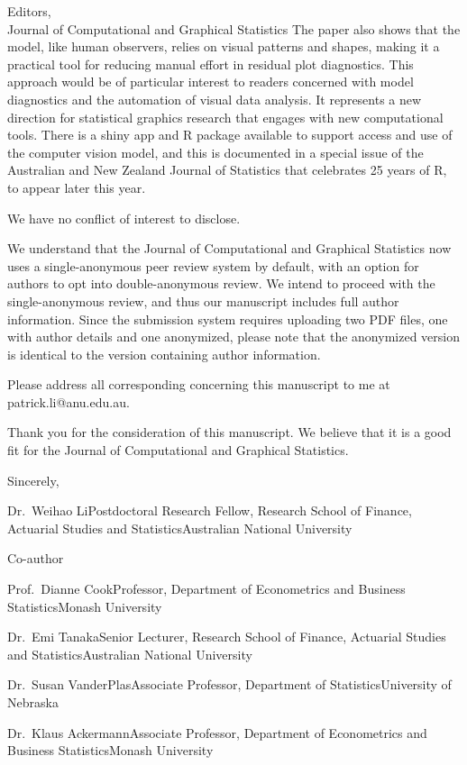 \documentclass[
  12pt,
  letterpaper]{letter}
\begin{document}
\begin{letter}{Editors,\\Journal of Computational and Graphical
Statistics}
The paper also shows that the model, like human observers, relies on
visual patterns and shapes, making it a practical tool for reducing
manual effort in residual plot diagnostics. This approach would be of
particular interest to readers concerned with model diagnostics and the
automation of visual data analysis. It represents a new direction for
statistical graphics research that engages with new computational tools.
There is a shiny app and R package available to support access and use
of the computer vision model, and this is documented in a special issue
of the Australian and New Zealand Journal of Statistics that celebrates
25 years of R, to appear later this year.

We have no conflict of interest to disclose.

We understand that the Journal of Computational and Graphical Statistics
now uses a single-anonymous peer review system by default, with an
option for authors to opt into double-anonymous review. We intend to
proceed with the single-anonymous review, and thus our manuscript
includes full author information. Since the submission system requires
uploading two PDF files, one with author details and one anonymized,
please note that the anonymized version is identical to the version
containing author information.

Please address all corresponding concerning this manuscript to me at
patrick.li@anu.edu.au.

Thank you for the consideration of this manuscript. We believe that it
is a good fit for the Journal of Computational and Graphical Statistics.

Sincerely,

\bigskip
\bigskip
\bigskip
\bigskip
\bigskip
\bigskip

Dr.~Weihao Li\newline Postdoctoral Research Fellow, Research School of
Finance, Actuarial Studies and Statistics\newline Australian National
University

Co-author

Prof.~Dianne Cook\newline Professor, Department of Econometrics and
Business Statistics\newline Monash University

Dr.~Emi Tanaka\newline Senior Lecturer, Research School of Finance,
Actuarial Studies and Statistics\newline Australian National University

Dr.~Susan VanderPlas\newline Associate Professor, Department of
Statistics\newline University of Nebraska

Dr.~Klaus Ackermann\newline Associate Professor, Department of
Econometrics and Business Statistics\newline Monash University



\vfill
\end{letter}
\end{document}
